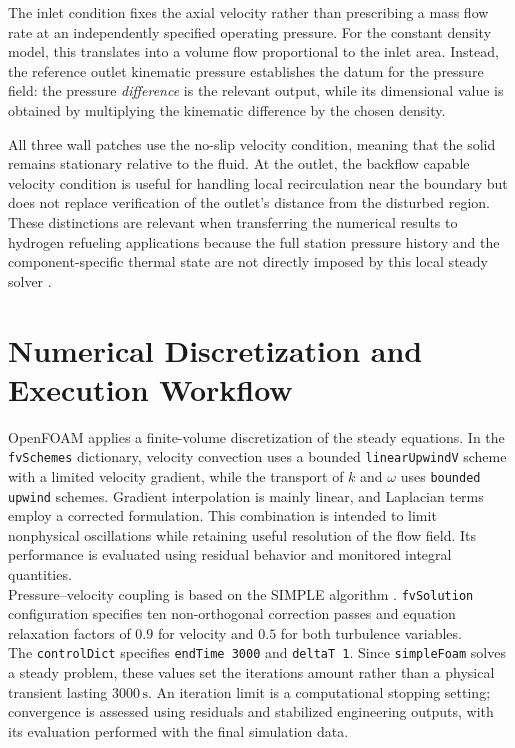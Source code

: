 The inlet condition fixes the axial velocity rather than prescribing a mass flow rate at an independently specified operating pressure. For the constant density model, this translates into a volume flow proportional to the inlet area. Instead, the reference outlet kinematic pressure establishes the datum for the pressure field: the pressure \emph{difference} is the relevant output, while its dimensional value is obtained by multiplying the kinematic difference by the chosen density.

All three wall patches use the no-slip velocity condition, meaning that the solid remains stationary relative to the fluid. At the outlet, the backflow capable velocity condition is useful for handling local recirculation near the boundary but does not replace verification of the outlet's distance from the disturbed region. These distinctions are relevant when transferring the numerical results to hydrogen refueling applications because the full station pressure history and the component-specific thermal state are not directly imposed by this local steady solver \cite{openfoam_user,sae_j2601}.

\section{Numerical Discretization and Execution Workflow}
\label{sec:workflow_automation}

OpenFOAM applies a finite-volume discretization of the steady equations. In the \texttt{fvSchemes} dictionary, velocity convection uses a bounded \texttt{linearUpwindV} scheme with a limited velocity gradient, while the transport of $k$ and $\omega$ uses \texttt{bounded upwind} schemes.
Gradient interpolation is mainly linear, and Laplacian terms employ a corrected formulation. This combination is intended to limit nonphysical oscillations while retaining useful resolution of the flow field. Its performance is evaluated using residual behavior and monitored integral quantities.\\

Pressure--velocity coupling is based on the SIMPLE algorithm \cite{openfoam_user,moukalled2016}. \texttt{fvSolution} configuration specifies ten non-orthogonal correction passes and equation relaxation factors of $0.9$ for velocity and $0.5$ for both turbulence variables. \\

The \texttt{controlDict} specifies \texttt{endTime 3000} and \texttt{deltaT 1}. Since \texttt{simpleFoam} solves a steady problem, these values set the iterations amount rather than a physical transient lasting $3000\,\mathrm{s}$. An iteration limit is a computational stopping setting; convergence is assessed using residuals and stabilized engineering outputs, with its evaluation performed with the final simulation data.\\

